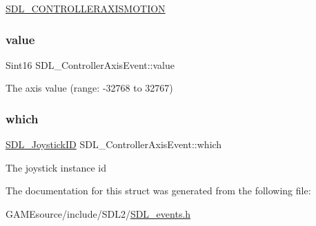 \mbox{\hyperlink{_s_d_l__events_8h_a3b589e89be6b35c02e0dd34a55f3fccaaca6330126f4126f6a45454fa046c25f3}{S\+D\+L\+\_\+\+C\+O\+N\+T\+R\+O\+L\+L\+E\+R\+A\+X\+I\+S\+M\+O\+T\+I\+ON}} \mbox{\label{struct_s_d_l___controller_axis_event_a1ed7f14255ed01b982d40a38791d475a}} 
\subsubsection{\texorpdfstring{value}{value}}
{\footnotesize\ttfamily Sint16 S\+D\+L\+\_\+\+Controller\+Axis\+Event\+::value}

The axis value (range\+: -\/32768 to 32767) \mbox{\label{struct_s_d_l___controller_axis_event_a07087f68ea9d64b50047d65312ee7b94}} 
\subsubsection{\texorpdfstring{which}{which}}
{\footnotesize\ttfamily \mbox{\hyperlink{_s_d_l__joystick_8h_a3c3d32500cb08f76ee8077983912c0bd}{S\+D\+L\+\_\+\+Joystick\+ID}} S\+D\+L\+\_\+\+Controller\+Axis\+Event\+::which}

The joystick instance id 

The documentation for this struct was generated from the following file\+:\begin{DoxyCompactItemize}
\item 
G\+A\+M\+Esource/include/\+S\+D\+L2/\mbox{\hyperlink{_s_d_l__events_8h}{S\+D\+L\+\_\+events.\+h}}\end{DoxyCompactItemize}
